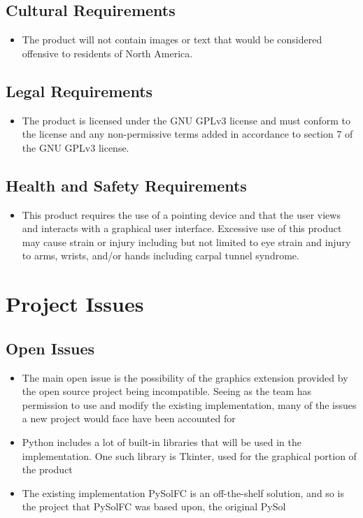 \documentclass{article}
\begin{document}
		\subsection{Cultural Requirements}
		\begin{itemize}
			\itemsep0em
			\item The product will not contain images or text that would be 
			considered offensive to residents of North America.
		\end{itemize}
		\subsection{Legal Requirements}
		\begin{itemize}
			\itemsep0em
			\item The product is licensed under the GNU GPLv3 license and must 
			conform to the license and any non-permissive terms added in 
			accordance to section 7 of the GNU GPLv3 license.
		\end{itemize}
		\subsection{Health and Safety Requirements}
		\begin{itemize}
			\itemsep0em
			\item This product requires the use of a pointing device and that the user
			views and interacts with a graphical user interface. Excessive use of this
			product may cause strain or injury including but not limited to eye strain
			and injury to arms, wrists, and/or hands including carpal tunnel syndrome.
		\end{itemize}
		
	\section{Project Issues}
		\subsection{Open Issues}
		\begin{itemize}
		\itemsep0em	
			\item The main open issue is the possibility of the graphics extension
			provided by the open source project being incompatible. Seeing as the team
			has permission to use and modify the existing implementation, many of the
			issues a new project would face have been accounted for
			\item Python includes a lot of built-in libraries that will be used in the
			 implementation. One such library is Tkinter, used for the graphical portion
			of the product
			\item The existing implementation PySolFC is an off-the-shelf solution,
			and so is the project that PySolFC was based upon, the original PySol
		\end{itemize}
\end{document}
